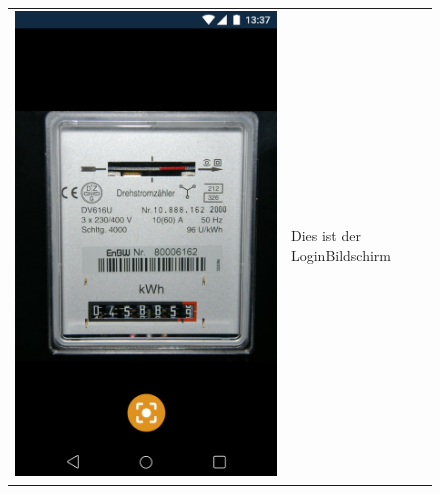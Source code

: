 \begin{figure}[h]
\begin{tabularx}{\textwidth}{X | X}
	\includegraphics[scale = 0.22]{img/AndroidMockup/SystemCamera} & Dies ist der LoginBildschirm \\ 
\end{tabularx}
\end{figure}

